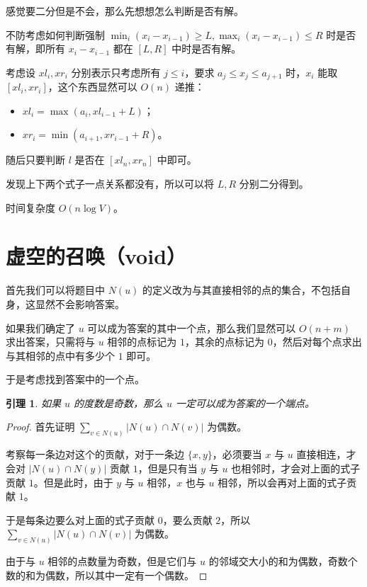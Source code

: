 \documentclass[12pt]{article}
\newtheorem{lem}{引理}[section]
\newcommand{\fancyheadRightText}{}
\begin{document}
感觉要二分但是不会，那么先想想怎么判断是否有解。

不防考虑如何判断强制 $\min_{i}(x_i-x_{i-1})\ge L,\max_{i}(x_i-x_{i-1})\le R$ 时是否有解，即所有 $x_i-x_{i-1}$ 都在 $[L,R]$ 中时是否有解。

考虑设 $xl_i,xr_i$ 分别表示只考虑所有 $j\le i$，要求 $a_j\le x_j\le a_{j+1}$ 时，$x_i$ 能取 $[xl_i,xr_i]$，这个东西显然可以 $O(n)$ 递推：

\begin{itemize}
    \item $xl_i=\max(a_i,xl_{i-1}+L)$；
    \item $xr_i=\min(a_{i+1},xr_{i-1}+R)$。
\end{itemize}

随后只要判断 $l$ 是否在 $[xl_n,xr_n]$ 中即可。

发现上下两个式子一点关系都没有，所以可以将 $L,R$ 分别二分得到。

时间复杂度 $O(n\log V)$。

\newpage

\section{虚空的召唤（void）}
\fancyhead[R]{\footnotesize \fancyheadRightText\quad 虚空的召唤（void）}

首先我们可以将题目中 $N(u)$ 的定义改为与其直接相邻的点的集合，不包括自身，这显然不会影响答案。

如果我们确定了 $u$ 可以成为答案的其中一个点，那么我们显然可以 $O(n+m)$ 求出答案，只需将与 $u$ 相邻的点标记为 $1$，其余的点标记为 $0$，然后对每个点求出与其相邻的点中有多少个 $1$ 即可。

于是考虑找到答案中的一个点。

\begin{lem}
    如果 $u$ 的度数是奇数，那么 $u$ 一定可以成为答案的一个端点。
\end{lem}

\begin{proof}
    首先证明 $\sum_{v\in N(u)} |N(u)\cap N(v)|$ 为偶数。

    考察每一条边对这个的贡献，对于一条边 $\{x,y\}$，必须要当 $x$ 与 $u$ 直接相连，才会对 $|N(u)\cap N(y)|$ 贡献 $1$，但是只有当 $y$ 与 $u$ 也相邻时，才会对上面的式子贡献 $1$。但是此时，由于 $y$ 与 $u$ 相邻，$x$ 也与 $u$ 相邻，所以会再对上面的式子贡献 $1$。

    于是每条边要么对上面的式子贡献 $0$，要么贡献 $2$，所以 $\sum_{v\in N(u)} |N(u)\cap N(v)|$ 为偶数。

    由于与 $u$ 相邻的点数量为奇数，但是它们与 $u$ 的邻域交大小的和为偶数，奇数个数的和为偶数，所以其中一定有一个偶数。
\end{proof}
\end{document}
